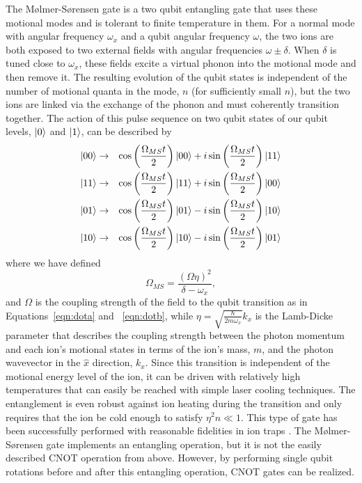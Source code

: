 The M{\o}lmer-S{\o}rensen gate is a two qubit entangling gate that uses these motional modes and is tolerant to finite temperature in them.  For a normal mode with angular frequency $\omega_x$ and a qubit angular frequency $\omega$, the two ions are both exposed to two external fields with angular frequencies $\omega \pm \delta$.  When $\delta$ is tuned close to $\omega_x$, these fields excite a virtual phonon into the motional mode and then remove it.  The resulting evolution of the qubit states is independent of the number of motional quanta in the mode, $n$ (for sufficiently small $n$), but the two ions are linked via the exchange of the phonon and must coherently transition together.  The action of this pulse sequence on two qubit states of our qubit levels, $\left| 0 \right>$ and $\left| 1 \right>$, can be described by
\begin{eqnarray}
	\left| 00 \right> &\rightarrow& \cos\left( \frac{\Omega_{MS} t}{2} \right) \left| 00 \right> + i \sin\left( \frac{\Omega_{MS} t}{2} \right) \left| 11 \right> \\
	\left| 11 \right> &\rightarrow& \cos\left( \frac{\Omega_{MS} t}{2} \right) \left| 11 \right> + i \sin\left( \frac{\Omega_{MS} t}{2} \right) \left| 00 \right> \\
	\left| 01 \right> &\rightarrow& \cos\left( \frac{\Omega_{MS} t}{2} \right) \left| 01 \right> - i \sin\left( \frac{\Omega_{MS} t}{2} \right) \left| 10 \right> \\
	\left| 10 \right> &\rightarrow& \cos\left( \frac{\Omega_{MS} t}{2} \right) \left| 10 \right> - i \sin\left( \frac{\Omega_{MS} t}{2} \right) \left| 01 \right> 
\end{eqnarray}
where we have defined
\begin{equation}
	\Omega_{MS} = \frac{(\Omega \eta)^2}{\delta - \omega_x}\mathrm{,}
\end{equation}
and $\Omega$ is the coupling strength of the field to the qubit transition as in Equations~\ref{eqn:dota} and ~\ref{eqn:dotb}, while $\eta = \sqrt{\frac{\hbar}{2 m \omega_x}} k_x$ is the Lamb-Dicke parameter that describes the coupling strength between the photon momentum and each ion's motional states in terms of the ion's mass, $m$, and the photon wavevector in the $\hat{x}$ direction, $k_x$.  Since this transition is independent of the motional energy level of the ion, it can be driven with relatively high temperatures that can easily be reached with simple laser cooling techniques.  The entanglement is even robust against ion heating during the transition and only requires that the ion be cold enough to satisfy $\eta^2 n \ll 1$.  This type of gate has been successfully performed with reasonable fidelities in ion traps \cite{Hayes:12,Hayes:10}.  The M{\o}lmer-S{\o}rensen gate implements an entangling operation, but it is not the easily described CNOT operation from above.  However, by performing single qubit rotations before and after this entangling operation, CNOT gates can be realized.
	

